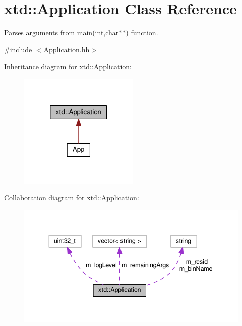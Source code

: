\hypertarget{classxtd_1_1Application}{\section{xtd\-:\-:Application Class Reference}
\label{classxtd_1_1Application}
}


Parses arguments from \hyperlink{doc_2example_2Application_8hh_a6b77b2233054447db17959182b5fb02b}{main(int,char$\ast$$\ast$)} function.  




{\ttfamily \#include $<$Application.\-hh$>$}



Inheritance diagram for xtd\-:\-:Application\-:
\nopagebreak
\begin{figure}[H]
\begin{center}
\leavevmode
\includegraphics[width=162pt]{classxtd_1_1Application__inherit__graph}
\end{center}
\end{figure}


Collaboration diagram for xtd\-:\-:Application\-:
\nopagebreak
\begin{figure}[H]
\begin{center}
\leavevmode
\includegraphics[width=340pt]{classxtd_1_1Application__coll__graph}
\end{center}
\end{figure}
